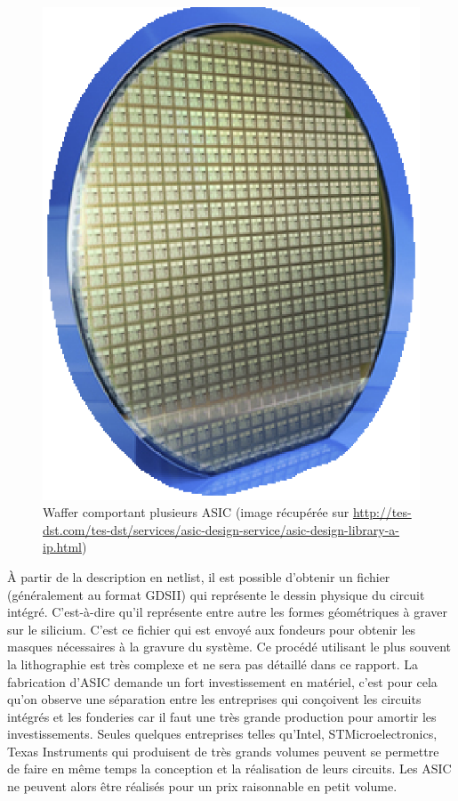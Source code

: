 \begin{figure}[hb]
\begin{center}
\includegraphics[scale=0.4]{asic.eps}
\end{center}
\caption{Waffer comportant plusieurs ASIC (image récupérée sur \url{http://tes-dst.com/tes-dst/services/asic-design-service/asic-design-library-a-ip.html})}
\end{figure}

À partir de la description en netlist, il est possible d'obtenir un fichier
(généralement au format GDSII) qui représente le dessin physique du circuit intégré.
C'est-à-dire qu'il représente entre autre les formes géométriques à graver sur le
silicium. C'est ce fichier qui est envoyé aux fondeurs pour obtenir les masques nécessaires à la gravure du système. Ce procédé utilisant le
plus souvent la lithographie est très complexe et ne sera pas détaillé dans ce
rapport. La fabrication d'ASIC demande un fort investissement en matériel, c'est
pour cela qu'on observe une séparation entre les entreprises qui conçoivent les
circuits intégrés et les fonderies car il faut une très grande production pour
amortir les investissements. Seules quelques entreprises telles qu'Intel,
STMicroelectronics, Texas Instruments qui produisent de très grands volumes peuvent
se permettre de faire en même temps la conception et la réalisation de leurs
circuits. Les ASIC ne peuvent alors être réalisés pour un prix raisonnable en petit
volume.


